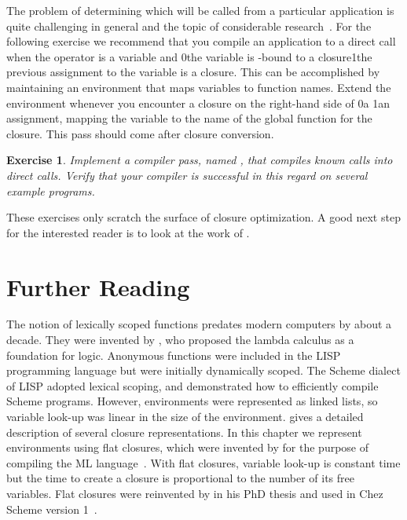 \documentclass[7x10]{TimesAPriori_MIT}%
\def\racketEd{0}
\def\pythonEd{1}
\def\edition{1}
\newcommand{\racket}[1]{{\if\edition\racketEd{#1}\fi}}
\newcommand{\pythonColor}[0]{}
\newcommand{\python}[1]{{\if\edition\pythonEd\pythonColor #1\fi}}
\newtheorem{exercise}[theorem]{Exercise}
\numberwithin{theorem}{chapter}
\numberwithin{definition}{chapter}
\numberwithin{equation}{chapter}
\begin{document}
The problem of determining which  will be called from a
particular application is quite challenging in general and the topic
of considerable research~\citep{Shivers:1988aa,Gilray:2016aa}. For the
following exercise we recommend that you compile an application to a
direct call when the operator is a variable and \racket{the variable
  is -bound to a closure}\python{the previous assignment to
  the variable is a closure}.  This can be accomplished by maintaining
an environment that maps variables to function names.  Extend the
environment whenever you encounter a closure on the right-hand side of
\racket{a }\python{an assignment}, mapping the variable to the
name of the global function for the closure. This pass should come
after closure conversion.

\begin{exercise}\normalfont\normalsize
Implement a compiler pass, named , that
compiles known calls into direct calls. Verify that your compiler is
successful in this regard on several example programs.
\end{exercise}

These exercises only scratch the surface of closure optimization. A
good next step for the interested reader is to look at the work of
\citet{Keep:2012ab}.

\section{Further Reading}

The notion of lexically scoped functions predates modern computers by
about a decade. They were invented by \citet{Church:1932aa}, who
proposed the lambda calculus as a foundation for logic. Anonymous
functions were included in the LISP~\citep{McCarthy:1960dz}
programming language but were initially dynamically scoped. The Scheme
dialect of LISP adopted lexical scoping, and
\citet{Guy-L.-Steele:1978yq} demonstrated how to efficiently compile
Scheme programs. However, environments were represented as linked
lists, so variable look-up was linear in the size of the
environment. \citet{Appel91} gives a detailed description of several
closure representations. In this chapter we represent environments
using flat closures, which were invented by
\citet{Cardelli:1983aa,Cardelli:1984aa} for the purpose of compiling
the ML language~\citep{Gordon:1978aa,Milner:1990fk}.  With flat
closures, variable look-up is constant time but the time to create a
closure is proportional to the number of its free variables.  Flat
closures were reinvented by \citet{Dybvig:1987ab} in his PhD thesis
and used in Chez Scheme version 1~\citep{Dybvig:2006aa}.
\end{document}
